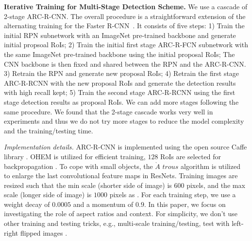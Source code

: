 \documentclass[10pt,twocolumn,letterpaper]{article}
\begin{document}
\textbf{Iterative Training for Multi-Stage Detection Scheme.} 
We use a cascade of 2-stage ARC-R-CNN. The overall procedure is a straightforward extension of the alternating training for the Faster R-CNN~\cite{faster_rcnn}. It consists of five steps:  
 1) Train the initial RPN subnetwork with an ImageNet pre-trained backbone and generate initial propsoal RoIs; 2) Train the initial first stage ARC-R-FCN subnetwork with the same ImageNet pre-trained backbone using the initial proposal RoIs; The CNN backbone is then fixed and shared between the RPN and the  ARC-R-CNN. 3) Retrain the RPN and generate new proposal RoIs; 4) Retrain the first stage ARC-R-RCNN with the new proposal RoIs and generate the detection results with high recall kept; 5) Train the second stage ARC-R-RCNN using the first stage detection results as proposal RoIs. We can add more stages following the same procedure. We found that the 2-stage cascade works very well in experiments and thus we do not try more stages to reduce the model complexity and the training/testing time. 


\textit{Implementation details.} ARC-R-CNN is implemented using the open source Caffe library \cite{caffe}. OHEM \cite{ohem} is utilized for efficient training, $128$ RoIs are selected for backpropagation \cite{rfcn}. To cope with small objects, the $\grave{A}$ $trous$ algorithm \cite{hole, mallat} is utilized to enlarge the last convolutional feature maps in ResNets.
Training images are resized such that the min scale (shorter side of image) is $600$ pixels, and the max scale (longer side of image) is $1000$ pixels as \cite{fast_rcnn}.  
For each training step, we use a weight decay of $0.0005$ and a momentum of $0.9$. 
In this paper, we focus on investigating the role of aspect ratios and context.
For simplicity, we don't use other training and testing tricks, e.g., multi-scale training/testing, test with left-right flipped images \cite{ion}.
\end{document}
